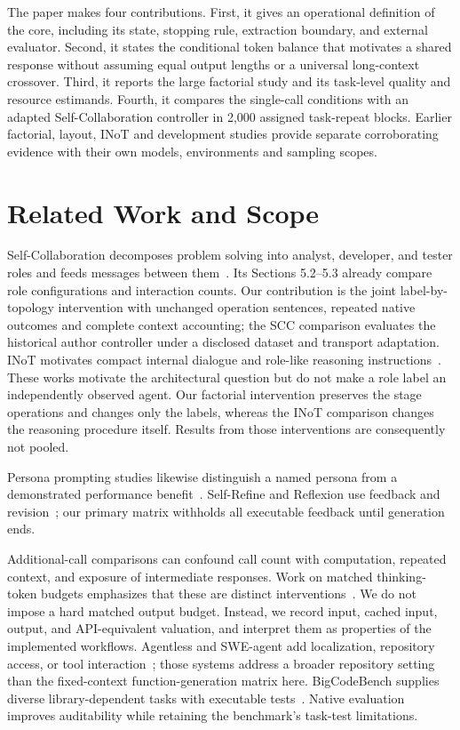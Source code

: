 The paper makes four contributions. First, it gives an operational definition of the core, including its state, stopping rule, extraction boundary, and external evaluator. Second, it states the conditional token balance that motivates a shared response without assuming equal output lengths or a universal long-context crossover. Third, it reports the large factorial study and its task-level quality and resource estimands. Fourth, it compares the single-call conditions with an adapted Self-Collaboration controller in 2,000 assigned task-repeat blocks. Earlier factorial, layout, INoT and development studies provide separate corroborating evidence with their own models, environments and sampling scopes.

\section{Related Work and Scope}
Self-Collaboration decomposes problem solving into analyst, developer, and tester roles and feeds messages between them~\cite{dong2023selfcollaboration}. Its Sections 5.2--5.3 already compare role configurations and interaction counts. Our contribution is the joint label-by-topology intervention with unchanged operation sentences, repeated native outcomes and complete context accounting; the SCC comparison evaluates the historical author controller under a disclosed dataset and transport adaptation. INoT motivates compact internal dialogue and role-like reasoning instructions~\cite{sun2025inot}. These works motivate the architectural question but do not make a role label an independently observed agent. Our factorial intervention preserves the stage operations and changes only the labels, whereas the INoT comparison changes the reasoning procedure itself. Results from those interventions are consequently not pooled.

Persona prompting studies likewise distinguish a named persona from a demonstrated performance benefit~\cite{zheng2024personas,araujo2025personas}. Self-Refine and Reflexion use feedback and revision~\cite{madaan2023selfrefine,shinn2023reflexion}; our primary matrix withholds all executable feedback until generation ends.

Additional-call comparisons can confound call count with computation, repeated context, and exposure of intermediate responses. Work on matched thinking-token budgets emphasizes that these are distinct interventions~\cite{tran2026budget}. We do not impose a hard matched output budget. Instead, we record input, cached input, output, and API-equivalent valuation, and interpret them as properties of the implemented workflows. Agentless and SWE-agent add localization, repository access, or tool interaction~\cite{xia2024agentless,yang2024sweagent}; those systems address a broader repository setting than the fixed-context function-generation matrix here. BigCodeBench supplies diverse library-dependent tasks with executable tests~\cite{zhuo2024bigcodebench}. Native evaluation improves auditability while retaining the benchmark's task-test limitations.

